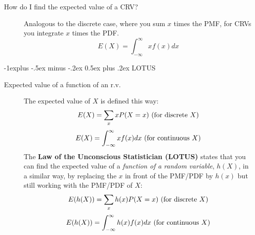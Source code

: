 \documentclass[10pt,landscape]{article}
\makeatletter
\renewcommand{\subsection}{\@startsection{subsection}{2}{0mm}%
                                {-1explus -.5ex minus -.2ex}%
                                {0.5ex plus .2ex}%
                                {\normalfont\normalsize\bfseries}}
\makeatother
\begin{document}
\begin{multicols*}{3}
\begin{description}
\item[How do I find the expected value of a CRV?] Analogous to the discrete case, where you sum $x$ times the PMF, for CRVs you integrate $x$ times the PDF.
\[E(X) = \int^\infty_{-\infty}xf(x)dx \]
\end{description}


\label{lotus}
\subsection{LOTUS}
\begin{description}
\item[Expected value of a function of an r.v.]
The expected value of $X$ is defined this way:
\[E(X) = \sum_x xP(X=x) \textnormal{ (for discrete $X$)}\]
\[E(X) = \int^\infty_{-\infty}xf(x)dx  \textnormal{ (for continuous $X$)}\]
The \textbf{Law of the Unconscious Statistician (LOTUS)} states that you can find the expected value of a \emph{function of a random variable}, $h(X)$, in a similar way, by replacing the $x$ in front of the PMF/PDF by $h(x)$ but still working with the PMF/PDF of $X$:
\[E(h(X)) = \sum_x h(x)P(X=x) \textnormal{ (for discrete $X$)}\]
\[E(h(X)) = \int^\infty_{-\infty}h(x)f(x)dx \textnormal{ (for continuous $X$)}\]
\end{description}



\end{multicols*}
\end{document}
